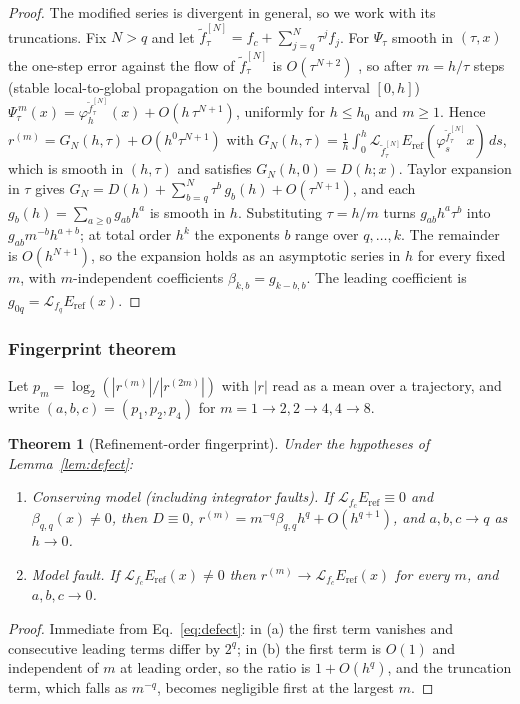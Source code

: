 \documentclass[10pt]{article}
\newtheorem{theorem}{Theorem}
\theoremstyle{definition}
\newcommand{\Lie}{\mathcal{L}}
\newcommand{\Eref}{E_{\mathrm{ref}}}
\begin{document}
\begin{proof}
The modified series is divergent in general, so we work with its truncations.
Fix $N>q$ and let $\tilde f^{[N]}_\tau=f_c+\sum_{j=q}^{N}\tau^jf_j$. For
$\Psi_\tau$ smooth in $(\tau,x)$ the one-step error against the flow of
$\tilde f^{[N]}_\tau$ is $O(\tau^{N+2})$ \citep[Ch.~IX]{hairer2006geometric},
so after $m=h/\tau$ steps (stable local-to-global propagation on the bounded
interval $[0,h]$) $\Psi_\tau^{\,m}(x)=\varphi^{\tilde f^{[N]}_\tau}_{h}(x)+O(h\,\tau^{N+1})$,
uniformly for $h\le h_0$ and $m\ge1$. Hence
$r^{(m)}=G_N(h,\tau)+O(h^{0}\tau^{N+1})$ with
$G_N(h,\tau)=\frac1h\int_0^h\Lie_{\tilde f^{[N]}_\tau}\Eref(\varphi^{\tilde f^{[N]}_\tau}_sx)\,ds$,
which is smooth in $(h,\tau)$ and satisfies $G_N(h,0)=D(h;x)$. Taylor
expansion in $\tau$ gives $G_N=D(h)+\sum_{b=q}^{N}\tau^b\,g_b(h)+O(\tau^{N+1})$,
and each $g_b(h)=\sum_{a\ge0}g_{ab}h^a$ is smooth in $h$. Substituting
$\tau=h/m$ turns $g_{ab}h^a\tau^b$ into $g_{ab}m^{-b}h^{a+b}$; at total order
$h^k$ the exponents $b$ range over $q,\dots,k$. The remainder is
$O(h^{N+1})$, so the expansion holds as an asymptotic series in $h$ for every
fixed $m$, with $m$-independent coefficients $\beta_{k,b}=g_{k-b,b}$. The
leading coefficient is $g_{0q}=\Lie_{f_q}\Eref(x)$.
\end{proof}

\subsubsection{Fingerprint theorem}

Let $p_{m}=\log_2(|r^{(m)}|/|r^{(2m)}|)$ with $|r|$ read as a mean over
a trajectory, and write $(a,b,c)=(p_1,p_2,p_4)$ for $m=1\to2,2\to4,4\to8$.

\begin{theorem}[Refinement-order fingerprint]\label{thm:fp}
Under the hypotheses of Lemma~\ref{lem:defect}:
\begin{enumerate}[label=(\alph*)]
  \item \emph{Conserving model (including integrator faults).} If $\Lie_{f_c}\Eref\equiv0$
  and $\beta_{q,q}(x)\neq0$,
  then $D\equiv0$, $r^{(m)}=m^{-q}\beta_{q,q}h^q+O(h^{q+1})$, and
  $a,b,c\to q$ as $h\to0$.
  \item \emph{Model fault.} If $\Lie_{f_c}\Eref(x)\ne0$ then
  $r^{(m)}\to\Lie_{f_c}\Eref(x)$ for every $m$, and $a,b,c\to0$.
\end{enumerate}
\end{theorem}

\begin{proof}
Immediate from Eq.~\eqref{eq:defect}: in (a) the first term vanishes and
consecutive leading terms differ by $2^q$; in (b) the first term is
$O(1)$ and independent of $m$ at leading order, so the ratio is
$1+O(h^q)$, and the truncation term, which falls as $m^{-q}$, becomes
negligible first at the largest $m$.
\end{proof}
\end{document}
